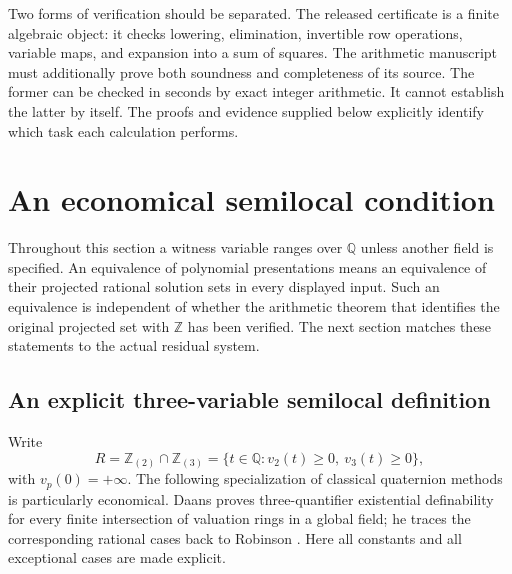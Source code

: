 \documentclass[11pt]{article}
\theoremstyle{definition}
\begin{document}
Two forms of verification should be separated. The released certificate
is a finite algebraic object: it checks lowering, elimination, invertible
row operations, variable maps, and expansion into a sum of squares.
The arithmetic manuscript must additionally prove both soundness and
completeness of its source. The former can be checked in seconds by exact
integer arithmetic. It cannot establish the latter by itself. The
proofs and evidence supplied below explicitly identify which task each
calculation performs.


\section{An economical semilocal condition}
\label{sec:lit-optimization}

Throughout this section a witness variable ranges over $\mathbb Q$ unless
another field is specified. An equivalence of polynomial presentations means
an equivalence of their projected rational solution sets in every displayed
input. Such an equivalence is independent of whether the arithmetic theorem
that identifies the original projected set with $\mathbb Z$ has been verified.
The next section matches these statements to the actual residual system.

\subsection{An explicit three-variable semilocal definition}

Write
\[
 R=\mathbb Z_{(2)}\cap\mathbb Z_{(3)}
   =\{t\in\mathbb Q:v_2(t)\ge0,\ v_3(t)\ge0\},
\]
with $v_p(0)=+\infty$. The following specialization of classical
quaternion methods is particularly economical. Daans proves three-quantifier
existential definability for every finite intersection of valuation rings
in a global field; he traces the corresponding rational cases back to
Robinson \cite[Proposition 4.2 and Remark 4.3]{Daans2024}.
Here all constants and all exceptional cases are made explicit.
\end{document}
